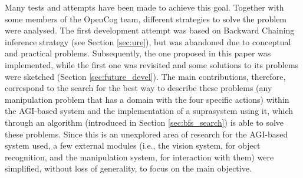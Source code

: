 Many tests and attempts have been made to achieve this goal. Together with some members of the OpenCog team, different strategies to solve the problem were analysed\footnotemark{}. The first development attempt was based on Backward Chaining inference strategy (see Section \ref{sec:ure}), but was abandoned due to conceptual and practical problems. Subsequently, the one proposed in this paper was implemented, while the first one was revisited and some solutions to its problems were sketched (Section \ref{sec:future_devel}).
The main contributions, therefore, correspond to the search for the best way to describe these problems (any manipulation problem that has a domain with the four specific actions) within the AGI-based system and the implementation of a suprasystem using it, which through an algorithm (introduced in Section \ref{sec:bfs_search}) is able to solve these problems.
Since this is an unexplored area of research for the AGI-based system used, a few external modules (i.e., the vision system, for object recognition, and the manipulation system, for interaction with them) were simplified, without loss of generality, to focus on the main objective.  
